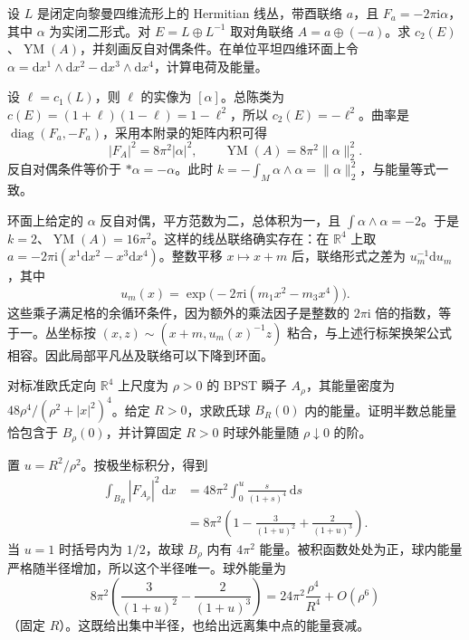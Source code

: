 \begin{exercise}\label{g3:ex:B-abelian-asd}
 设 \(L\) 是闭定向黎曼四维流形上的 Hermitian 线丛，带酉联络 \(a\)，且 \(F_a=-2\pi\mathrm i\alpha\)，其中 \(\alpha\) 为实闭二形式。对 \(E=L\oplus L^{-1}\) 取对角联络 \(A=a\oplus(-a)\)。求 \(c_2(E)\)、\(\operatorname{YM}(A)\)，并刻画反自对偶条件。在单位平坦四维环面上令 \(\alpha=\mathrm dx^1\wedge\mathrm dx^2-\mathrm dx^3\wedge\mathrm dx^4\)，计算电荷及能量。
\end{exercise}
\begin{solution}
 设 \(\ell=c_1(L)\)，则 \(\ell\) 的实像为 \([\alpha]\)。总陈类为
 \(c(E)=(1+\ell)(1-\ell)=1-\ell^2\)，所以 \(c_2(E)=-\ell^2\)。曲率是 \(\operatorname{diag}(F_a,-F_a)\)，采用本附录的矩阵内积可得
 \[
  |F_A|^2=8\pi^2|\alpha|^2,
  \qquad \operatorname{YM}(A)=8\pi^2\|\alpha\|_2^2.
 \]
 反自对偶条件等价于 \(*\alpha=-\alpha\)。此时
 \(k=-\int_M\alpha\wedge\alpha=\|\alpha\|_2^2\)，与能量等式一致。

 环面上给定的 \(\alpha\) 反自对偶，平方范数为二，总体积为一，且 \(\int\alpha\wedge\alpha=-2\)。于是 \(k=2\)、\(\operatorname{YM}(A)=16\pi^2\)。这样的线丛联络确实存在：在 \(\mathbb R^4\) 上取
 \(a=-2\pi\mathrm i(x^1\mathrm dx^2-x^3\mathrm dx^4)\)。整数平移 \(x\mapsto x+m\) 后，联络形式之差为 \(u_m^{-1}\mathrm du_m\)，其中
 \[
  u_m(x)=\exp\bigl(-2\pi\mathrm i(m_1x^2-m_3x^4)\bigr).
 \]
 这些乘子满足格的余循环条件，因为额外的乘法因子是整数的 \(2\pi\mathrm i\) 倍的指数，等于一。丛坐标按 \((x,z)\sim(x+m,u_m(x)^{-1}z)\) 粘合，与上述行标架换架公式相容。因此局部平凡丛及联络可以下降到环面。
\end{solution}

\begin{exercise}\label{g3:ex:B-bpst-half-energy}
 对标准欧氏定向 \(\mathbb R^4\) 上尺度为 \(\rho>0\) 的 BPST 瞬子 \(A_\rho\)，其能量密度为 \(48\rho^4/(\rho^2+|x|^2)^4\)。给定 \(R>0\)，求欧氏球 \(B_R(0)\) 内的能量。证明半数总能量恰包含于 \(B_\rho(0)\)，并计算固定 \(R>0\) 时球外能量随 \(\rho\downarrow0\) 的阶。
\end{exercise}
\begin{solution}
 置 \(u=R^2/\rho^2\)。按极坐标积分，得到
 \[
 \begin{aligned}
  \int_{B_R}|F_{A_\rho}|^2\,\mathrm dx
  &=48\pi^2\int_0^u\frac{s}{(1+s)^4}\,\mathrm ds\\
  &=8\pi^2\left(1-\frac3{(1+u)^2}+\frac2{(1+u)^3}\right).
 \end{aligned}
 \]
 当 \(u=1\) 时括号内为 \(1/2\)，故球 \(B_\rho\) 内有 \(4\pi^2\) 能量。被积函数处处为正，球内能量严格随半径增加，所以这个半径唯一。球外能量为
 \[
  8\pi^2\left(\frac3{(1+u)^2}-\frac2{(1+u)^3}\right)
    =24\pi^2\frac{\rho^4}{R^4}+O(\rho^6)
 \]
 （固定 \(R\)）。这既给出集中半径，也给出远离集中点的能量衰减。
\end{solution}

